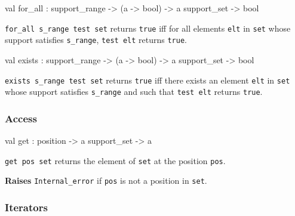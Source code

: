 \label{val:Constraint.for-underscoreall}\begin{ocamldoccode}
val for_all : support_range -> ({\textquotesingle}a -> bool) -> {\textquotesingle}a support_set -> bool
\end{ocamldoccode}
\begin{ocamldocdescription}
{\tt{for\_all s\_range test set}} returns {\tt{true}} iff for all elements {\tt{elt}} in {\tt{set}}
    whose support satisfies {\tt{s\_range}}, {\tt{test elt}} returns {\tt{true}}.


\end{ocamldocdescription}




\label{val:Constraint.exists}\begin{ocamldoccode}
val exists : support_range -> ({\textquotesingle}a -> bool) -> {\textquotesingle}a support_set -> bool
\end{ocamldoccode}
\begin{ocamldocdescription}
{\tt{exists s\_range test set}} returns {\tt{true}} iff there exists an element {\tt{elt}} in {\tt{set}}
    whose support satisfies {\tt{s\_range}} and such that {\tt{test elt}} returns {\tt{true}}.


\end{ocamldocdescription}




\subsubsection{Access}




\label{val:Constraint.get}\begin{ocamldoccode}
val get : position -> {\textquotesingle}a support_set -> {\textquotesingle}a
\end{ocamldoccode}
\begin{ocamldocdescription}
{\tt{get pos set}} returns the element of {\tt{set}} at the position {\tt{pos}}.

{\bf Raises} {\tt{Internal\_error}} if {\tt{pos}} is not a position in {\tt{set}}.


\end{ocamldocdescription}




\subsubsection{Iterators}




